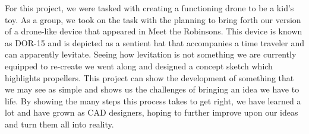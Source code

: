 
For this project, we were tasked with creating a functioning drone to be a kid's toy. As a group, we took on the task with the planning to bring forth our version of a drone-like device that appeared in Meet the Robinsons. This device is known as DOR-15 and is depicted as a sentient hat that accompanies a time traveler and can apparently levitate. Seeing how levitation is not something we are currently equipped to re-create we went along and designed a concept sketch which highlights propellers. This project can show the development of something that we may see as simple and shows us the challenges of bringing an idea we have to life. By showing the many steps this process takes to get right, we have learned a lot and have grown as CAD designers, hoping to further improve upon our ideas and turn them all into reality. \par
